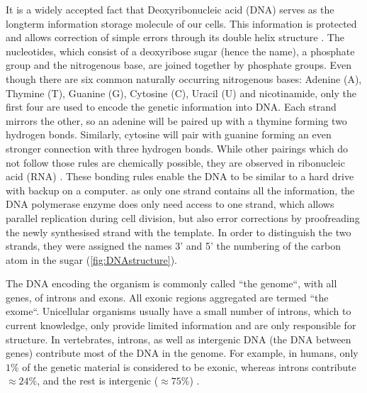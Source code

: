 It is a widely accepted fact\remove{,} that Deoxyribonucleic acid (DNA) serves as the long\add{-}term information storage molecule of our cells. This information is protected and allows  correction of simple errors through its double helix structure \cite{Watson1953,Liang1998}. The nucleotides, which consist of a deoxyribose sugar (hence the name), a phosphate group and the nitrogenous base, are joined together by phosphate groups. Even though there are six common naturally occurring nitrogenous bases: Adenine (A), Thymine (T), Guanine (G), Cytosine (C), Uracil (U) and nicotinamide, only the first four\add{,} are used to encode the genetic information into DNA. Each strand mirrors the other, so an adenine will be paired up with a thymine forming two hydrogen bonds. Similarly, cytosine will pair with guanine forming an even stronger connection with three hydrogen bonds. While other pairings which do not follow those rules are chemically possible, they are  observed in ribonucleic acid (RNA) \cite{Sinden1994}. These  bonding rules enable the DNA to be similar to a hard drive with backup on a computer.  as only one strand contains all the information, the DNA polymerase enzyme does only need access to one strand, which allows parallel replication during cell division, but also error corrections\remove{,} by proofreading the newly synthesised strand with the template. In order  to distinguish the two strands, they were assigned the names 3' and 5'  the numbering of the  carbon atom in the sugar (\autoref{fig:DNAstructure}).

The  DNA encoding the organism is commonly called ``the genome``, with all genes,  of introns and exons. All exonic regions aggregated are termed ``the exome``. Unicellular organisms usually have a small number of introns, which to current knowledge, only provide limited information and are only responsible for  structure. In vertebrates,  introns, as well as intergenic DNA (the DNA between genes) contribute most of the DNA in the genome. For example, in humans, only $1\%$ of the genetic material is considered to be exonic, whereas introns contribute $\approx 24\%$, and the rest is intergenic ($\approx 75\%$) \cite{Venter2001}.

